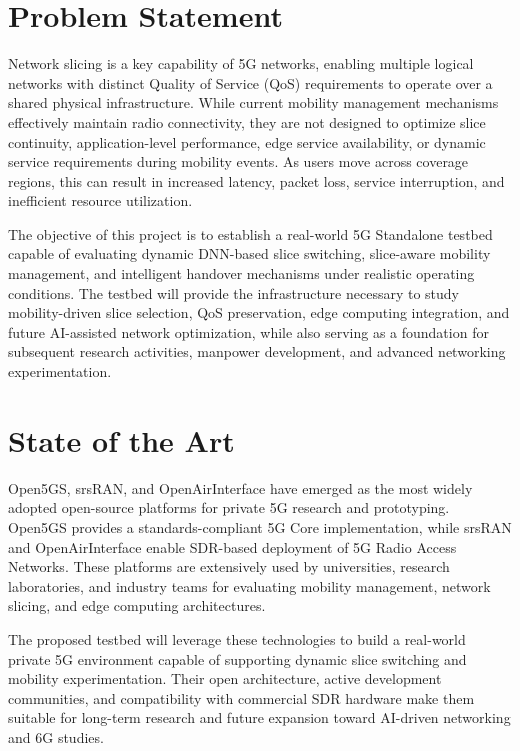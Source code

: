 \documentclass[12pt,a4paper]{article}
\begin{document}
\section{Problem Statement}

Network slicing is a key capability of 5G networks, enabling multiple logical networks with distinct Quality of Service (QoS) requirements to operate over a shared physical infrastructure. While current mobility management mechanisms effectively maintain radio connectivity, they are not designed to optimize slice continuity, application-level performance, edge service availability, or dynamic service requirements during mobility events. As users move across coverage regions, this can result in increased latency, packet loss, service interruption, and inefficient resource utilization.

The objective of this project is to establish a real-world 5G Standalone testbed capable of evaluating dynamic DNN-based slice switching, slice-aware mobility management, and intelligent handover mechanisms under realistic operating conditions. The testbed will provide the infrastructure necessary to study mobility-driven slice selection, QoS preservation, edge computing integration, and future AI-assisted network optimization, while also serving as a foundation for subsequent research activities, manpower development, and advanced networking experimentation.

\section{State of the Art}

Open5GS, srsRAN, and OpenAirInterface have emerged as the most widely adopted open-source platforms for private 5G research and prototyping. Open5GS provides a standards-compliant 5G Core implementation, while srsRAN and OpenAirInterface enable SDR-based deployment of 5G Radio Access Networks. These platforms are extensively used by universities, research laboratories, and industry teams for evaluating mobility management, network slicing, and edge computing architectures.

The proposed testbed will leverage these technologies to build a real-world private 5G environment capable of supporting dynamic slice switching and mobility experimentation. Their open architecture, active development communities, and compatibility with commercial SDR hardware make them suitable for long-term research and future expansion toward AI-driven networking and 6G studies.
\end{document}
